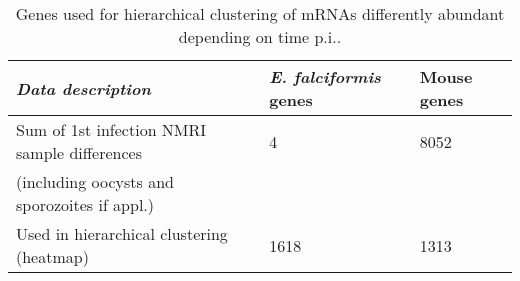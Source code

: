 \documentclass{bmcart}
\begin{document}
\setlength{\tabcolsep}{10pt}
\begin{table}[H]
\small
\begin{center}
\caption{Genes used for hierarchical clustering of mRNAs differently abundant depending on time p.i..}
\begin{tabular}{*3l}    \toprule
	\textit{Data description} & \emph{E. falciformis} genes & Mouse genes	\\ \midrule
	Sum of 1st infection NMRI sample differences	& 4 & 8052 \\ 
	(including oocysts and sporozoites if appl.)	\\	
	Used in hierarchical clustering (heatmap)  	& 1618 & 1313 \\ 	\bottomrule	
\hline
\end{tabular}
\end{center}
\end{table}



\end{document}

